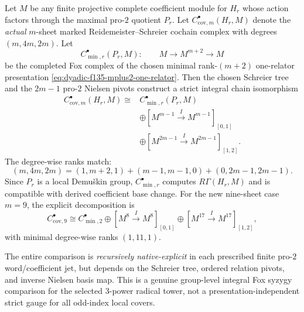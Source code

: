 \begin{theorem}
\label{thm:dyadic-f135-uniform-integral-fox-tietze}
Let $M$ be any
finite projective
complete
coefficient
module for
$H_r$ whose
action factors
through the
maximal pro-$2$
quotient $P_r$.
Let
$C_{\mathrm{cov},m}^\bullet(H_r,M)$
denote the
\emph{actual}
$m$-sheet
marked
Reidemeister--Schreier
cochain complex
with degrees
$(m,4m,2m)$.
Let
\[
C_{\min,r}^\bullet(P_r,M):
\qquad
M\longrightarrow
M^{m+2}\longrightarrow M
\]
be the
completed Fox
complex of
the chosen
minimal
rank-$(m+2)$
one-relator
presentation
\eqref{eq:dyadic-f135-mplus2-one-relator}.
Then the
chosen
Schreier tree
and the
$2m-1$
pro-$2$ Nielsen
pivots construct
a strict integral
chain isomorphism
\begin{equation}\label{eq:dyadic-f135-general-fox-chain-split}
\boxed{
\begin{aligned}
C_{\mathrm{cov},m}^\bullet(H_r,M)
\cong{}&
C_{\min,r}^\bullet(P_r,M)\\
&\oplus
[M^{m-1}\xrightarrow{\,I\,}
 M^{m-1}]_{[0,1]}\\
&\oplus
[M^{2m-1}\xrightarrow{\,I\,}
 M^{2m-1}]_{[1,2]}.
\end{aligned}}
\end{equation}
The degree-wise
ranks match:
\[
(m,4m,2m)
=
(1,m+2,1)
+(m-1,m-1,0)
+(0,2m-1,2m-1).
\]
Since $P_r$
is a local
Demu\v{s}kin
group,
$C_{\min,r}^\bullet$
computes
$R\Gamma(H_r,M)$
and is compatible
with derived
coefficient
base change.
For the new
nine-sheet case
$m=9$,
the explicit
decomposition is
\begin{equation}\label{eq:dyadic-f135-nine-fox-chain-split}
\boxed{
C_{\mathrm{cov},9}^\bullet
\cong
C_{\min,2}^\bullet
\oplus
[M^8\xrightarrow I M^8]_{[0,1]}
\oplus
[M^{17}\xrightarrow I M^{17}]_{[1,2]},
}
\end{equation}
with minimal
degree-wise
ranks $(1,11,1)$.

The entire
comparison is
\emph{recursively
native-explicit}
in each prescribed
finite pro-$2$
word/coefficient
jet, but depends
on the Schreier
tree, ordered
relation pivots,
and inverse
Nielsen basis
map.  This is
a genuine
group-level
integral
Fox syzygy
comparison
for the
selected
$3$-power
radical tower,
not a
presentation-independent
strict gauge
for all
odd-index
local covers.
\end{theorem}

